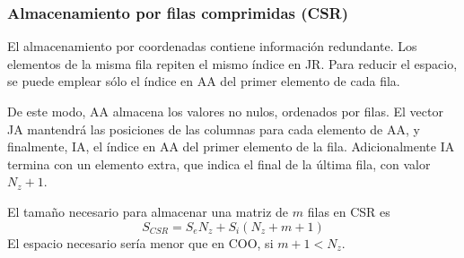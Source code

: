 \subsubsection{Almacenamiento por filas comprimidas (CSR)}

El almacenamiento por coordenadas contiene información redundante. Los elementos 
de la misma fila repiten el mismo índice en JR. Para reducir el espacio, se 
puede emplear sólo el índice en AA del primer elemento de cada fila.

De este modo, AA almacena los valores no nulos, ordenados por filas. El vector 
JA mantendrá las posiciones de las columnas para cada elemento de AA, y 
finalmente, IA, el índice en AA del primer elemento de la fila. Adicionalmente 
IA termina con un elemento extra, que indica el final de la última fila, con 
valor $N_z + 1$.

El tamaño necesario para almacenar una matriz de $m$ filas en CSR es
$$ S_{CSR} = S_e N_z + S_i (N_z + m + 1) $$
El espacio necesario sería menor que en COO, si $m + 1 < N_z$.

